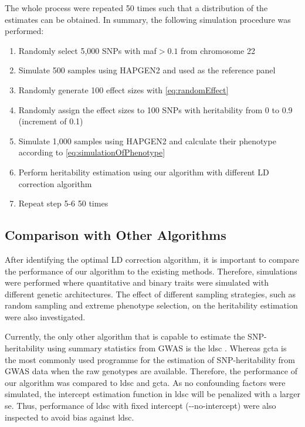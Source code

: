 		The whole process were repeated 50 times such that a distribution of the estimates can be obtained. 
		In summary, the following simulation procedure was performed:
		\begin{enumerate}
			\item Randomly select 5,000 \glspl{SNP} with \gls{maf}$>0.1$ from chromosome 22
			\item Simulate 500 samples using HAPGEN2 and used as the reference panel
			\item Randomly generate 100 effect sizes with \cref{eq:randomEffect}
			\item Randomly assign the effect sizes to 100 \glspl{SNP} with heritability from 0 to 0.9 (increment of 0.1)
			\item Simulate 1,000 samples using HAPGEN2 and calculate their phenotype according to \cref{eq:simulationOfPhenotype} 
			\item Perform heritability estimation using our algorithm with different \gls{LD} correction algorithm
			\item Repeat step 5-6 50 times
		\end{enumerate}
		
		\subsection{Comparison with Other Algorithms}
		After identifying the optimal \gls{LD} correction algorithm, it is important to compare the performance of our algorithm to the existing methods.
		Therefore, simulations were performed where quantitative and binary traits were simulated with different genetic architectures. 
		The effect of different sampling strategies, such as random sampling and extreme phenotype selection, on the heritability estimation were also investigated.
		
		Currently, the only other algorithm that is capable to estimate the \gls{SNP}-heritability using summary statistics from \gls{GWAS} is the \gls{ldsc} \citep{Bulik-Sullivan2015}.
		Whereas \gls{gcta} \citep{Yang2011} is the most commonly used programme for the estimation of \gls{SNP}-heritability from \gls{GWAS} data when the raw genotypes are available. 
		Therefore, the performance of our algorithm was compared to \gls{ldsc} and \gls{gcta}.
		As no confounding factors were simulated, the intercept estimation function in \gls{ldsc} will be penalized with a larger \gls{se}. 
		Thus, performance of \gls{ldsc} with fixed intercept (-{}-no-intercept) were also inspected to avoid bias against \gls{ldsc}.
		
